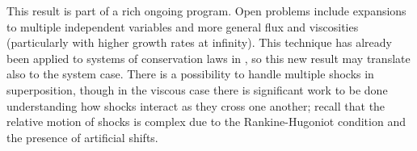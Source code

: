 This result is part of a rich ongoing program.  Open problems include expansions to multiple independent variables and more general flux and viscosities (particularly with higher growth rates at infinity).  This technique has already been applied to systems of conservation laws in \cite{KaVa.navier}, so this new result may translate also to the system case.  There is a possibility to handle multiple shocks in superposition, though in the viscous case there is significant work to be done understanding how shocks interact as they cross one another; recall that the relative motion of shocks is complex due to the Rankine-Hugoniot condition and the presence of artificial shifts.  


%
%
%
%

